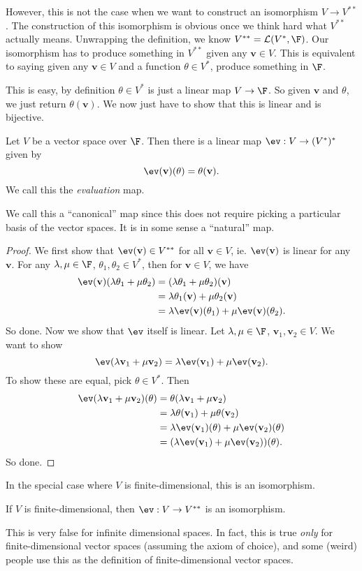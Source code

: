 \documentclass[a4paper]{article}
\begin{document}
However, this is not the case when we want to construct an isomorphism $V \to V^{**}$. The construction of this isomorphism is obvious once we think hard what $V^{**}$ actually means. Unwrapping the definition, we know $V^{**} = \mathcal{L}(V^*, \F)$. Our isomorphism has to produce something in $V^{**}$ given any $\mathbf{v} \in V$. This is equivalent to saying given any $\mathbf{v} \in V$ and a function $\theta \in V^*$, produce something in $\F$.

This is easy, by definition $\theta \in V^*$ is just a linear map $V \to \F$. So given $\mathbf{v}$ and $\theta$, we just return $\theta(\mathbf{v})$. We now just have to show that this is linear and is bijective.
\begin{lemma}
  Let $V$ be a vector space over $\F$. Then there is a linear map $\ev: V\to (V^*)^*$ given by
  \[
    \ev (\mathbf{v})(\theta) = \theta(\mathbf{v}).
  \]
  We call this the \emph{evaluation} map.
\end{lemma}
We call this a ``canonical'' map since this does not require picking a particular basis of the vector spaces. It is in some sense a ``natural'' map.

\begin{proof}
  We first show that $\ev(\mathbf{v}) \in V^{**}$ for all $\mathbf{v}\in V$, ie. $\ev (\mathbf{v})$ is linear for any $\mathbf{v}$. For any $\lambda, \mu\in \F$, $\theta_1, \theta_2 \in V^*$, then for $\mathbf{v} \in V$, we have
  \begin{align*}
    \ev(\mathbf{v})(\lambda\theta_1 + \mu\theta_2) &= (\lambda\theta_1 + \mu\theta_2)(\mathbf{v}) \\
    &= \lambda\theta_1(\mathbf{v}) + \mu\theta_2(\mathbf{v}) \\
    &= \lambda\ev(\mathbf{v})(\theta_1) + \mu \ev(\mathbf{v})(\theta_2).
  \end{align*}
  So done. Now we show that $\ev$ itself is linear. Let $\lambda, \mu\in \F$, $\mathbf{v}_1, \mathbf{v}_2 \in V$. We want to show
  \[
    \ev(\lambda\mathbf{v}_1 + \mu \mathbf{v}_2) = \lambda \ev (\mathbf{v}_1) + \mu \ev(\mathbf{v}_2).
  \]
  To show these are equal, pick $\theta \in V^*$. Then
  \begin{align*}
    \ev(\lambda \mathbf{v}_1 + \mu \mathbf{v}_2)(\theta) &= \theta(\lambda\mathbf{v}_1 + \mu \mathbf{v}_2) \\
    &= \lambda\theta(\mathbf{v}_1) + \mu \theta(\mathbf{v}_2) \\
    &= \lambda \ev(\mathbf{v}_1)(\theta) + \mu \ev(\mathbf{v}_2)(\theta) \\
    &= (\lambda \ev(\mathbf{v}_1) + \mu \ev(\mathbf{v}_2))(\theta).
  \end{align*}
  So done.
\end{proof}
In the special case where $V$ is finite-dimensional, this is an isomorphism.
\begin{lemma}
  If $V$ is finite-dimensional, then $\ev: V \to V^{**}$ is an isomorphism.
\end{lemma}
This is very false for infinite dimensional spaces. In fact, this is true \emph{only} for finite-dimensional vector spaces (assuming the axiom of choice), and some (weird) people use this as the definition of finite-dimensional vector spaces.
\end{document}
